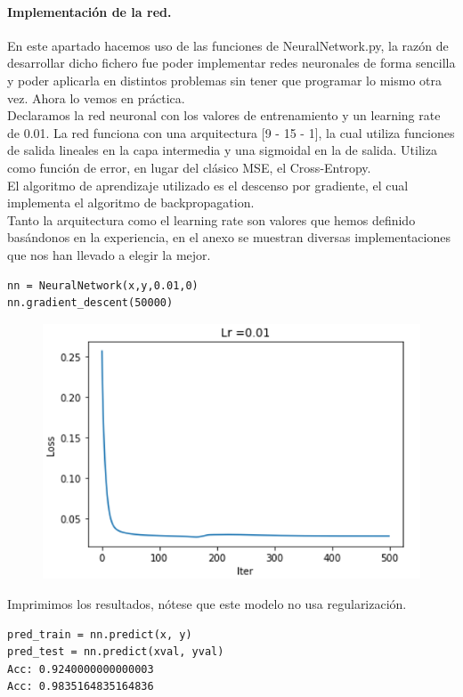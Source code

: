 \documentclass[a4paper,10pt]{article}
\begin{document}
\paragraph{Implementación de la red.}
En este apartado hacemos uso de las funciones de NeuralNetwork.py, la razón de desarrollar dicho fichero fue poder implementar redes neuronales de forma sencilla y poder aplicarla en distintos problemas sin tener que programar lo mismo otra vez. Ahora lo vemos en práctica.\\
Declaramos la red neuronal con los valores de entrenamiento y un learning rate de 0.01. La red funciona con una arquitectura [9 - 15 - 1], la cual utiliza funciones de salida lineales en la capa intermedia y una sigmoidal en la de salida. Utiliza como función de error, en lugar del clásico MSE, el Cross-Entropy. \\El algoritmo de aprendizaje utilizado es el descenso por gradiente, el cual implementa el algoritmo de backpropagation.\\
Tanto la arquitectura como el learning rate son valores que hemos definido basándonos en la experiencia, en el anexo se muestran diversas implementaciones que nos han llevado a elegir la mejor.
\begin{lstlisting}
nn = NeuralNetwork(x,y,0.01,0)
nn.gradient_descent(50000)
\end{lstlisting}
\begin{figure}[H]
\centering
\includegraphics[scale=0.6]{Annotation 2020-03-23 190119.png}
\end{figure}

Imprimimos los resultados, nótese que este modelo no usa regularización.
\begin{lstlisting}
pred_train = nn.predict(x, y)
pred_test = nn.predict(xval, yval)
Acc: 0.9240000000000003
Acc: 0.9835164835164836
\end{lstlisting}
\end{document}
